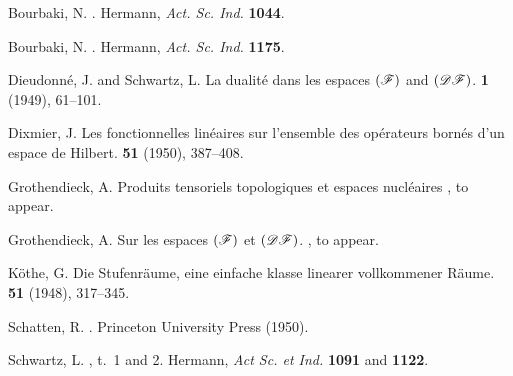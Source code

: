 \documentclass{article}
\theoremstyle{plain}
\newcommand{\DF}{\mbox{\normalfont($\mathscr{DF}$)}}
\newcommand{\FF}{\mbox{\normalfont($\mathscr{F}$)}}
\begin{document}
\begin{thebibliography}{9}

  {\sc Bourbaki, N.}
  .
  \newblock Hermann, {\em Act. Sc. Ind.} \textbf{1044}.

  {\sc Bourbaki, N.}
  .
  \newblock Hermann, {\em Act. Sc. Ind.} \textbf{1175}.

  {\sc Dieudonn\'{e}, J. and Schwartz, L.}
  \newblock La dualit\'{e} dans les espaces $\FF$ and $\DF$.
   \textbf{1} (1949), 61--101.

  {\sc Dixmier, J.}
  \newblock Les fonctionnelles lin\'{e}aires sur l'ensemble des op\'{e}rateurs born\'{e}s d'un espace de Hilbert.
   \textbf{51} (1950), 387--408.

  {\sc Grothendieck, A.}
  \newblock Produits tensoriels topologiques et espaces nucl\'{e}aires
  , to appear.

  {\sc Grothendieck, A.}
  \newblock Sur les espaces $\FF$ et $\DF$.
  , to appear.

  {\sc K\"{o}the, G.}
  \newblock Die Stufenr\"{a}ume, eine einfache klasse linearer vollkommener R\"{a}ume.
   \textbf{51} (1948), 317--345.

  {\sc Schatten, R.}
  .
  \newblock Princeton University Press (1950).

  {\sc Schwartz, L.}
  , t.~1 and 2.
  \newblock Hermann, {\em Act Sc. et Ind.} \textbf{1091} and \textbf{1122}.

\end{thebibliography}
\end{document}
